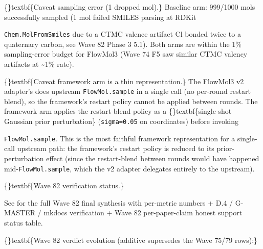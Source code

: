 \documentclass{article}
\begin{document}
\{\}textbf\{Caveat  sampling error (1 dropped mol).\} Baseline arm: 999/1000 mols successfully sampled (1 mol failed SMILES parsing at RDKit

\texttt{Chem.MolFromSmiles} due to a CTMC valence artifact  Cl bonded twice to a quaternary carbon, see Wave 82 Phase 3 5.1). Both arms are within the 1\% sampling-error budget for FlowMol3 (Wave 74 F5 saw similar CTMC valency artifacts at \textasciitilde{}1\% rate).

\{\}textbf\{Caveat  framework arm is a thin representation.\} The FlowMol3 v2 adapter's  does upstream \texttt{FlowMol.sample} in a single call (no per-round restart blend), so the framework's restart policy cannot be applied between rounds. The framework arm applies the restart-blend policy as a \{\}textbf\{single-shot Gaussian prior perturbation\} (\texttt{sigma=0.05} on coordinates) before invoking

\texttt{FlowMol.sample}. This is the most faithful framework representation for a single-call upstream path: the framework's restart policy is reduced to its prior-perturbation effect (since the restart-blend between rounds would have happened mid-\texttt{FlowMol.sample}, which the v2 adapter delegates entirely to the upstream).

\{\}textbf\{Wave 82 verification status.\}

\begin{table}[ht]
\centering
\small
{}%
\end{table}

See  for the full Wave 82 final synthesis with per-metric numbers + D.4 / G-MASTER / mkdocs verification + Wave 82 per-paper-claim honest support status table.

\{\}textbf\{Wave 82 verdict evolution (additive  supersedes the Wave 75/79 rows):\}
\end{document}
